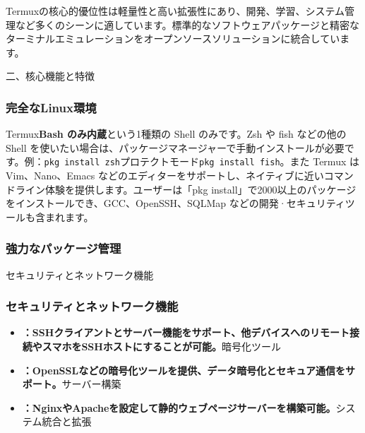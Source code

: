 


Termuxの核心的優位性は軽量性と高い拡張性にあり、開発、学習、システム管理など多くのシーンに適しています。標準的なソフトウェアパッケージと精密なターミナルエミュレーションをオープンソースソリューションに統合しています。

二、核心機能と特徴


\subsubsection*{完全なLinux環境}

Termux\textbf{Bash のみ内蔵}という1種類の Shell のみです。Zsh や fish などの他の Shell を使いたい場合は、パッケージマネージャーで手動インストールが必要です。例：\texttt{pkg install zsh}プロテクトモード\texttt{pkg install fish}。また Termux は Vim、Nano、Emacs などのエディターをサポートし、ネイティブに近いコマンドライン体験を提供します。ユーザーは「pkg install」で2000以上のパッケージをインストールでき、GCC、OpenSSH、SQLMap などの開発·セキュリティツールも含まれます。

\subsubsection*{強力なパッケージ管理}

セキュリティとネットワーク機能

\subsubsection*{セキュリティとネットワーク機能}

\begin{itemize}
  \item \textbf{：SSHクライアントとサーバー機能をサポート、他デバイスへのリモート接続やスマホをSSHホストにすることが可能。}暗号化ツール
  \item \textbf{：OpenSSLなどの暗号化ツールを提供、データ暗号化とセキュア通信をサポート。}サーバー構築
  \item \textbf{：NginxやApacheを設定して静的ウェブページサーバーを構築可能。}システム統合と拡張
\end{itemize}

